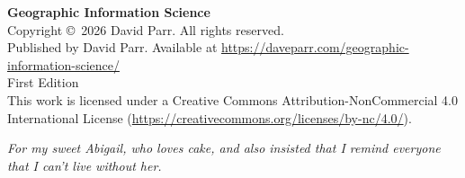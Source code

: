 
\newpage
\thispagestyle{empty}
\vspace*{\fill}
\begin{flushleft}
\small
\textbf{Geographic Information Science} \\
Copyright \copyright\ 2026 David Parr. All rights reserved. \\[1em]
Published by David Parr. Available at
\url{https://daveparr.com/geographic-information-science/} \\[1em]
First Edition \\[1em]
This work is licensed under a Creative Commons Attribution-NonCommercial 4.0
International License (\url{https://creativecommons.org/licenses/by-nc/4.0/}).
\end{flushleft}
\newpage

\thispagestyle{empty}
\vspace*{\fill}
\begin{center}
\textit{For my sweet Abigail, who loves cake, and also insisted that I remind
everyone that I can't live without her.}
\end{center}
\vspace*{\fill}
\newpage

\tableofcontents
\newpage
